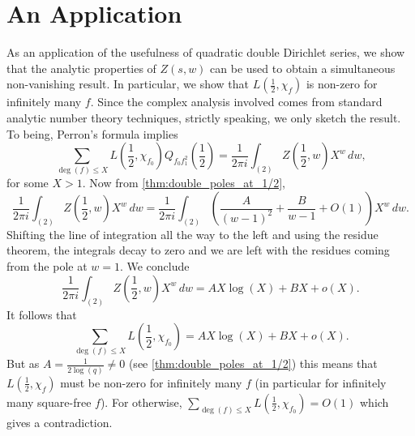 \documentclass[12pt,reqno,oneside]{amsart}
\begin{document}
\section*{An Application}
    As an application of the usefulness of quadratic double Dirichlet series, we show that the analytic properties of $Z(s,w)$ can be used to obtain a simultaneous non-vanishing result. In particular, we show that $L\left(\frac{1}{2},\chi_{f}\right)$ is non-zero for infinitely many $f$. Since the complex analysis involved comes from standard analytic number theory techniques, strictly speaking, we only sketch the result. To being, Perron's formula implies
    \[
        \sum_{\deg(f) \le X}L\left(\frac{1}{2},\chi_{f_{0}}\right)Q_{f_{0}f_{1}^{2}}\left(\frac{1}{2}\right) = \frac{1}{2\pi i}\int_{(2)}Z\left(\frac{1}{2},w\right)X^{w}\,dw,
    \]
    for some $X > 1$. Now from \cref{thm:double_poles_at_1/2},
    \[
        \frac{1}{2\pi i}\int_{(2)}Z\left(\frac{1}{2},w\right)X^{w}\,dw = \frac{1}{2\pi i}\int_{(2)}\left(\frac{A}{(w-1)^{2}}+\frac{B}{w-1}+O(1)\right)X^{w}\,dw.
    \]
    Shifting the line of integration all the way to the left and using the residue theorem, the integrals decay to zero and we are left with the residues coming from the pole at $w = 1$. We conclude
    \[
        \frac{1}{2\pi i}\int_{(2)}Z\left(\frac{1}{2},w\right)X^{w}\,dw = AX\log(X)+BX+o(X).
    \]
    It follows that
    \[
        \sum_{\deg(f) \le X}L\left(\frac{1}{2},\chi_{f_{0}}\right) = AX\log(X)+BX+o(X).
    \]
    But as $A = \frac{1}{2\log(q)} \neq 0$ (see \cref{thm:double_poles_at_1/2}) this means that $L\left(\frac{1}{2},\chi_{f}\right)$ must be non-zero for infinitely many $f$ (in particular for infinitely many square-free $f$). For otherwise, $\sum_{\deg(f) \le X}L\left(\frac{1}{2},\chi_{f_{0}}\right) = O(1)$ which gives a contradiction.
\end{document}
